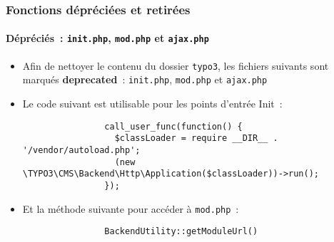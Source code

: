 \begin{frame}[fragile]
	\frametitle{Fonctions dépréciées et retirées}
	\framesubtitle{Dépréciés~: \texttt{init.php}, \texttt{mod.php} et \texttt{ajax.php}}


	\begin{itemize}

		\item Afin de nettoyer le contenu du dossier \texttt{typo3}, les fichiers suivants sont
			marqués \textbf{deprecated}~: \texttt{init.php}, \texttt{mod.php} et \texttt{ajax.php}

		\item Le code suivant est utilisable pour les points d'entrée Init~:

			\begin{lstlisting}
				call_user_func(function() {
				  $classLoader = require __DIR__ . '/vendor/autoload.php';
				  (new \TYPO3\CMS\Backend\Http\Application($classLoader))->run();
				});
			\end{lstlisting}

		\item Et la méthode suivante pour accéder à \texttt{mod.php}~:

			\begin{lstlisting}
				BackendUtility::getModuleUrl()
			\end{lstlisting}

	\end{itemize}

\end{frame}


